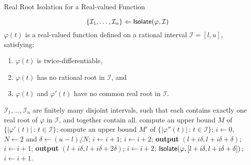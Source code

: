 \documentclass[a4paper,UKenglish,cleveref,autoref,thm-restate,authorcolumns]{lipics-v2019}
\newcommand{\I}{\mathcal{I}}
\begin{document}
\begin{algorithm}[ht!]
	\caption{\textsf{Real Root Isolation for a Real-valued Function}}\label{isol}
	\begin{algorithmic}[1]
		\item[] $$\{\I_1,\ldots,\I_n\} \Leftarrow {\sf Isolate}(\varphi,\I)$$
		\Require $\varphi(t)$ is a real-valued function
			defined on a rational interval $\I=[l,u]$,
			satisfying:
			\begin{enumerate}
			    \item $\varphi(t)$ is twice-differentiable,
				\item $\varphi(t)$ has no rational root in $\I$, and
				\item $\varphi(t)$ and $\varphi'(t)$ have no common real root in $\I$.
			\end{enumerate}
		\Ensure $\I_1,\ldots,\I_n$ are finitely many disjoint intervals,
			such that each contains exactly one real root of $\varphi$ in $\I$,
			and together contain all.
		\State compute an upper bound $M$ of $\{|\varphi'(t)|\,:\,t\in\I\}$;
		\State compute an upper bound $M'$ of $\{|\varphi''(t)|\,:\,t\in\I\}$;
		\State $i \gets 0$, $N \gets 2$ and $\delta \gets (u-l)/N$;
		\label{ln:unsat1}
			$i \gets i+1$;
		\label{ln:unsat2}
			$i \gets i+2$;
		\label{ln:dec1}
		\label{ln:sat1}
			\textbf{output} $(l+i\delta,l+i\delta+\delta)$;
		\EndIf
		\State $i \gets i+1$;
		\label{ln:dec2}
		\label{ln:sat2}
			\textbf{output} $(l+i\delta,l+i\delta+2\delta)$;
		\EndIf
		\State $i \gets i+2$;
		\Else
		\State\label{ln:rec} ${\sf Isolate}(\varphi,[l+i\delta,l+i\delta+\delta])$;
		\State $i \gets i+1$.
		\EndIf
		\EndWhile
	\end{algorithmic}
\end{algorithm}
\end{document}

